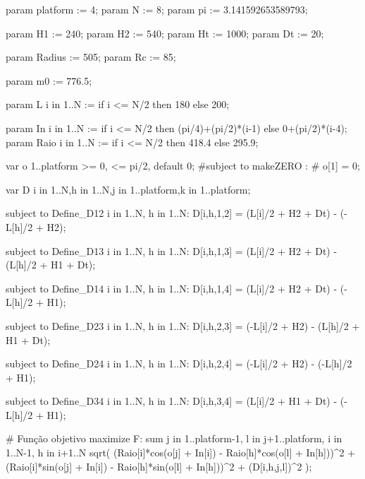 param platform := 4;
param N := 8;
param pi := 3.141592653589793;

param H1 := 240;
param H2 := 540;
param Ht := 1000;
param Dt := 20;

param Radius := 505;
param Rc := 85;

param m0 := 776.5;

param L {i in 1..N} :=
    if i <= N/2 then 180
    else 200;

param In {i in 1..N} :=
    if i <= N/2 then (pi/4)+(pi/2)*(i-1)
    else 0+(pi/2)*(i-4);
param Raio {i in 1..N} :=
    if i <= N/2 then 418.4
    else 295.9;


var o {1..platform} >= 0, <= pi/2, default 0;
#subject to makeZERO :
#    o[1] = 0;

var D {i in 1..N,h in 1..N,j in 1..platform,k in 1..platform};

subject to Define_D12 {i in 1..N, h in 1..N}:
    D[i,h,1,2] = (L[i]/2 + H2 + Dt) - (-L[h]/2 + H2);

subject to Define_D13 {i in 1..N, h in 1..N}:
    D[i,h,1,3] = (L[i]/2 + H2 + Dt) - (L[h]/2 + H1 + Dt);

subject to Define_D14 {i in 1..N, h in 1..N}:
    D[i,h,1,4] = (L[i]/2 + H2 + Dt) - (-L[h]/2 + H1);

subject to Define_D23 {i in 1..N, h in 1..N}:
    D[i,h,2,3] = (-L[i]/2 + H2) - (L[h]/2 + H1 + Dt);

subject to Define_D24 {i in 1..N, h in 1..N}:
    D[i,h,2,4] = (-L[i]/2 + H2) - (-L[h]/2 + H1);

subject to Define_D34 {i in 1..N, h in 1..N}:
    D[i,h,3,4] = (L[i]/2 + H1 + Dt) - (-L[h]/2 + H1);

# Função objetivo
maximize F:
    sum {j in 1..platform-1, l in j+1..platform, i in 1..N-1, h in i+1..N} 
        sqrt(
            (Raio[i]*cos(o[j] + In[i]) - Raio[h]*cos(o[l] + In[h]))^2
            + (Raio[i]*sin(o[j] + In[i]) - Raio[h]*sin(o[l] + In[h]))^2
            + (D[i,h,j,l])^2
        );


